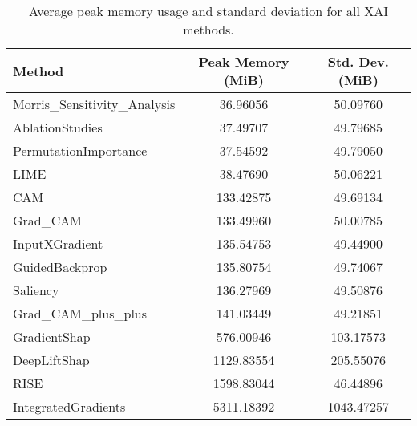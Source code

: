 \begin{table}[ht]
\centering
\begin{tabular}{lcc}
\hline
Method & Peak Memory (MiB) & Std. Dev. (MiB) \\
\hline
Morris_Sensitivity_Analysis & 36.96056 & 50.09760 \\
AblationStudies & 37.49707 & 49.79685 \\
PermutationImportance & 37.54592 & 49.79050 \\
LIME & 38.47690 & 50.06221 \\
CAM & 133.42875 & 49.69134 \\
Grad_CAM & 133.49960 & 50.00785 \\
InputXGradient & 135.54753 & 49.44900 \\
GuidedBackprop & 135.80754 & 49.74067 \\
Saliency & 136.27969 & 49.50876 \\
Grad_CAM_plus_plus & 141.03449 & 49.21851 \\
GradientShap & 576.00946 & 103.17573 \\
DeepLiftShap & 1129.83554 & 205.55076 \\
RISE & 1598.83044 & 46.44896 \\
IntegratedGradients & 5311.18392 & 1043.47257 \\
\hline
\end{tabular}
\caption{Average peak memory usage and standard deviation for all XAI methods.}
\label{tab:memory_all}
\end{table}
